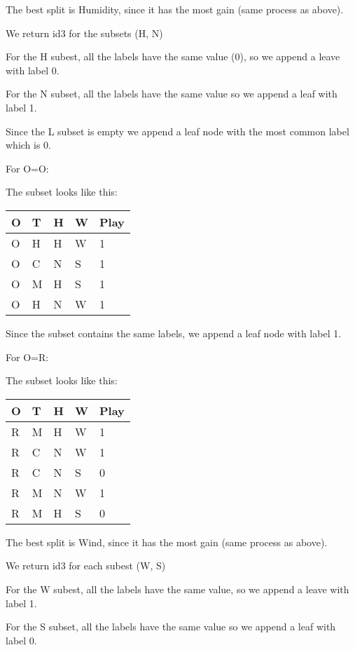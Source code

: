 \documentclass[12pt, fullpage,letterpaper]{article}
\begin{document}
\begin{enumerate}
\begin{enumerate}
		The best split is Humidity, since it has the most gain (same process as above).
		
		We return id3 for the subsets (H, N)
		
		For the H subest, all the labels have the same value (0), so we append a leave with label 0.
		
		For the N subset, all the labels have the same value so we append a leaf with label 1.
		
		Since the L subset is empty  we append a leaf node with the most common label which is 0. 
		
		For O=O:
		
		The subset looks like this:
		
		\begin{tabular}{|l|l|l|l|l|}
			\hline
			O & T & H & W & Play \\ \hline
			O & H & H & W & 1    \\ \hline
			O & C & N & S & 1    \\ \hline
			O & M & H & S & 1    \\ \hline
			O & H & N & W & 1    \\ \hline
			\end{tabular}
		
		
		Since the subset contains the same labels, we append a leaf node with label 1.
		
		For O=R:
		
		The subset looks like this:
		
		\begin{tabular}{|l|l|l|l|l|}
			\hline
			O & T & H & W & Play \\ \hline
			R & M & H & W & 1    \\ \hline
			R & C & N & W & 1    \\ \hline
			R & C & N & S & 0    \\ \hline
			R & M & N & W & 1    \\ \hline
			R & M & H & S & 0    \\ \hline
			\end{tabular}
		
		
		The best split is Wind, since it has the most gain (same process as above).
		
		We return id3 for each subest (W, S)
		
		For the W subest, all the labels have the same value, so we append a leave with label 1.
		
		For the S subset, all the labels have the same value so we append a leaf with label 0.
		

\end{enumerate}
\end{enumerate}
\end{document}
